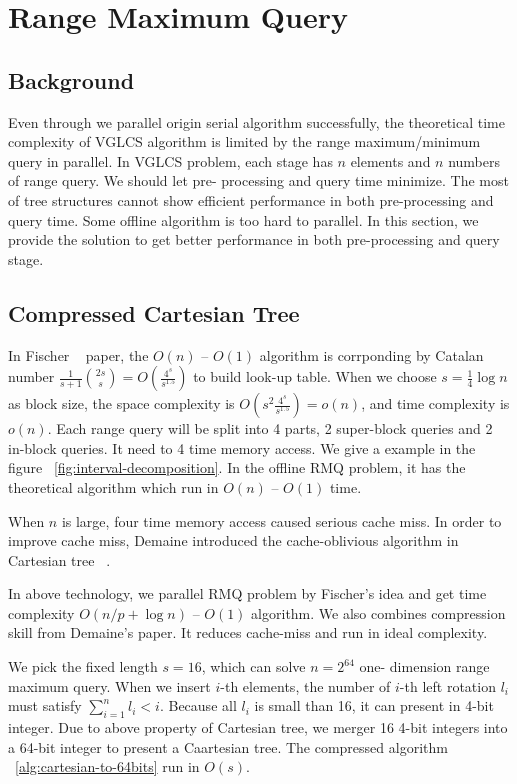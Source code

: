 \section{Range Maximum Query}
\label{sec:parallelRMQ}

\subsection{Background}

Even through we parallel origin serial algorithm successfully, the
theoretical time complexity of VGLCS algorithm is limited by the range
maximum/minimum query in parallel.  In VGLCS problem, each stage has
$n$ elements and $n$ numbers of range query. We should let pre-
processing and query time minimize. The most of tree structures cannot
show efficient performance in both pre-processing and query time. Some
offline algorithm is too hard to parallel. In this section, we provide
the solution to get better performance in both pre-processing and
query stage.

\subsection{Compressed Cartesian Tree}

In Fischer ~\cite{fischer} paper, the $O(n)$ -- $O(1)$ algorithm is
corrponding by Catalan number $\frac{1}{s+1}\binom{2s}{s} =
O(\frac{4^s}{s^{1.5}})$ to build look-up table. When we choose $s =
\frac{1}{4} \log n$ as block size, the space complexity is $O(s^2
\frac{4^s}{s^{1.5}}) = o(n)$, and time complexity is $o(n)$. Each
range query will be split into 4 parts, 2 super-block queries and 2
in-block queries. It need to 4 time memory access. We give a example
in the figure ~\ref{fig:interval-decomposition}.  In the offline RMQ
problem, it has the theoretical algorithm which run in $O(n)$ --
$O(1)$ time.

When $n$ is large, four time memory access caused serious cache miss.
In order to improve cache miss, Demaine introduced the cache-oblivious
algorithm in Cartesian tree ~\cite{demaine}.

In above technology, we parallel RMQ problem by Fischer's idea and get
time complexity $O(n / p + \log n)$ -- $O(1)$ algorithm. We also
combines compression skill from Demaine's paper. It reduces cache-miss
and run in ideal complexity.

We pick the fixed length $s = 16$, which can solve $n = 2^{64}$ one-
dimension range maximum query. When we insert $i$-th elements, the
number of $i$-th left rotation $l_i$ must satisfy $\sum_{i=1}^{n} l_i
< i$. Because all $l_i$ is small than 16, it can present in 4-bit
integer.  Due to above property of Cartesian tree, we merger 16 4-bit
integers into a 64-bit integer to present a Caartesian tree. The
compressed algorithm ~\ref{alg:cartesian-to-64bits} run in $O(s)$.

